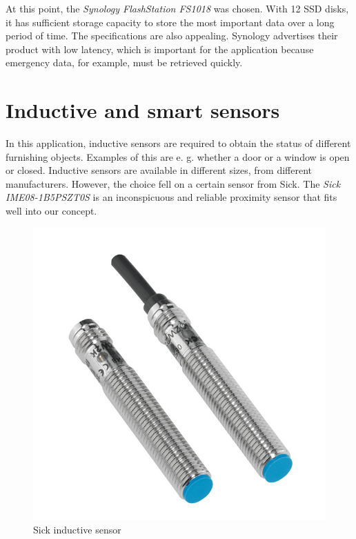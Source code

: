 At this point, the \textit{Synology FlashStation FS1018} was chosen. With 12 SSD disks, it has sufficient storage capacity to store the most important data over a long period of time. The specifications are also appealing. Synology advertises their product with low latency, which is important for the application because emergency data, for example, must be retrieved quickly.
\newpage
\section{Inductive and smart sensors}
In this application, inductive sensors are required to obtain the status of different furnishing objects. Examples of this are e. g. whether a door or a window is open or closed. Inductive sensors are available in different sizes, from different manufacturers. However, the choice fell on a certain sensor from Sick. The \textit{Sick IME08-1B5PSZT0S} is an inconspicuous and reliable proximity sensor that fits well into our concept. 

\begin{figure}[h]
	\centering
	\includegraphics[width=.4\textwidth]{images/CostAnalysis/sickIni} 
	\caption[Sick inductive sensor]{Sick inductive sensor\footnotemark}
	\label{fig:sickIni}
\end{figure}

